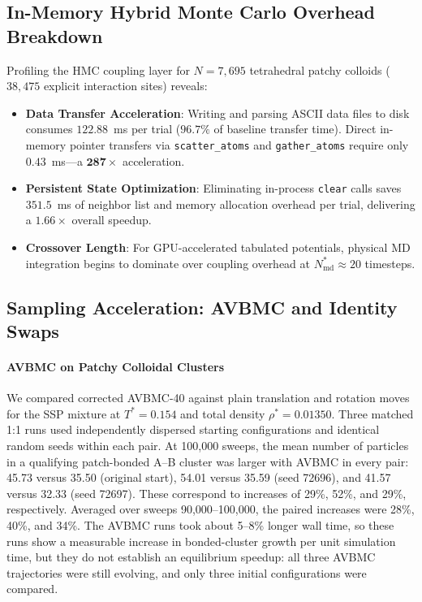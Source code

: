 \documentclass[final,5p,times,twocolumn]{elsarticle}
\begin{document}
\subsection{In-Memory Hybrid Monte Carlo Overhead Breakdown}
\label{sec:bench_hmc}

Profiling the HMC coupling layer for $N = 7{,}695$ tetrahedral patchy colloids ($38{,}475$ explicit interaction sites) reveals:
\begin{itemize}
    \item \textbf{Data Transfer Acceleration}: Writing and parsing
      ASCII data files to disk consumes $122.88$~ms per trial
      ($96.7\%$ of baseline transfer time). Direct in-memory pointer
      transfers via \texttt{scatter\_atoms} and \texttt{gather\_atoms}
      require only $0.43$~ms—a $\mathbf{287\times}$ acceleration. 
    \item \textbf{Persistent State Optimization}: Eliminating
      in-process \texttt{clear} calls saves $351.5$~ms of neighbor
      list and memory allocation overhead per trial, delivering a
      $1.66\times$ overall speedup. 
    \item \textbf{Crossover Length}: For GPU-accelerated tabulated
      potentials, physical MD integration begins to dominate over
      coupling overhead at $N_{\text{md}}^* \approx 20$ timesteps. 
\end{itemize}

\subsection{Sampling Acceleration: AVBMC and Identity Swaps}
\label{sec:bench_advanced_moves}

\paragraph{AVBMC on Patchy Colloidal Clusters}
We compared corrected AVBMC-40 against plain translation and rotation
moves for the SSP mixture at $T^*=0.154$ and total density
$\rho^*=0.01350$. Three matched 1:1 runs used independently dispersed
starting configurations and identical random seeds within each pair.
At 100,000 sweeps, the mean number of particles in a qualifying
patch-bonded A--B cluster was larger with AVBMC in every pair: 45.73
versus 35.50 (original start), 54.01 versus 35.59 (seed 72696), and
41.57 versus 32.33 (seed 72697). These correspond to increases of
29\%, 52\%, and 29\%, respectively. Averaged over sweeps 90,000--100,000,
the paired increases were 28\%, 40\%, and 34\%. The AVBMC runs took
about 5--8\% longer wall time, so these runs show a measurable increase
in bonded-cluster growth per unit simulation time, but they do not
establish an equilibrium speedup: all three AVBMC trajectories were
still evolving, and only three initial configurations were compared.
\end{document}
